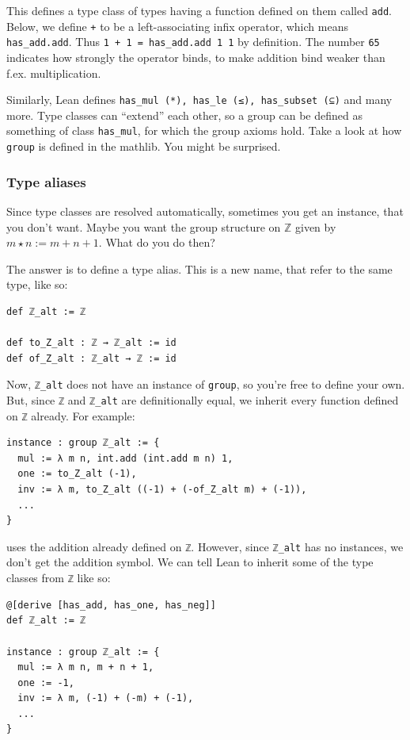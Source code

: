 \documentclass[a4paper, 12pt]{article}
\newcommand{\Z}{\mathbb{Z}}
\newcommand{\lean}[1]{\texttt{#1}}
\theoremstyle{changedot}
\theoremstyle{changedotbreak}
\theoremstyle{nonumberplain}
\begin{document}
This defines a type class of types having a function defined on them called \lean{add}. Below, we define \lean{+} to be a left-associating infix operator, which means \lean{has_add.add}. Thus \lean{1 + 1 = has_add.add 1 1} by definition. The number \lean{65} indicates how strongly the operator binds, to make addition bind weaker than f.ex. multiplication.

Similarly, Lean defines \lean{has_mul (*), has_le (≤), has_subset (⊆)} and many more. Type classes can ``extend'' each other, so a group can be defined as something of class \lean{has_mul}, for which the group axioms hold. Take a look at how \lean{group} is defined in the mathlib. You might be surprised.

\subsubsection{Type aliases}\label{sss:typealias}
Since type classes are resolved automatically, sometimes you get an instance, that you don't want. Maybe you want the group structure on $\Z$ given by $m \star n := m + n + 1$. What do you do then?

The answer is to define a type alias. This is a new name, that refer to the same type, like so:

\begin{verbatim}
def ℤ_alt := ℤ

def to_Z_alt : ℤ → ℤ_alt := id
def of_Z_alt : ℤ_alt → ℤ := id
\end{verbatim}

Now, \lean{ℤ_alt} does not have an instance of \lean{group}, so you're free to define your own. But, since \lean{ℤ} and \lean{ℤ_alt} are definitionally equal, we inherit every function defined on \lean{ℤ} already. For example:

\begin{verbatim}
instance : group ℤ_alt := {
  mul := λ m n, int.add (int.add m n) 1,
  one := to_Z_alt (-1),
  inv := λ m, to_Z_alt ((-1) + (-of_Z_alt m) + (-1)),
  ...
}
\end{verbatim}

uses the addition already defined on \lean{ℤ}. However, since \lean{ℤ_alt} has no instances, we don't get the addition symbol. We can tell Lean to inherit some of the type classes from \lean{ℤ} like so:

\begin{verbatim}
@[derive [has_add, has_one, has_neg]]
def ℤ_alt := ℤ

instance : group ℤ_alt := {
  mul := λ m n, m + n + 1,
  one := -1,
  inv := λ m, (-1) + (-m) + (-1),
  ...
}
\end{verbatim}
\end{document}
